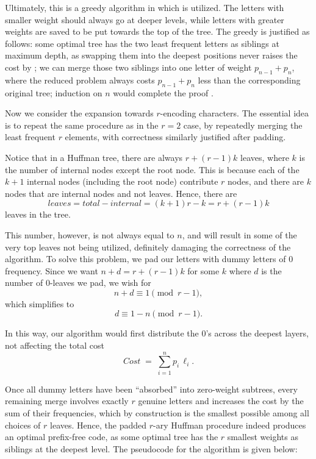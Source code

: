 \documentclass[a4paper,10pt,english]{scrartcl}
\begin{document}
Ultimately, this is a greedy algorithm in which  is utilized. The letters with smaller weight should always go at deeper levels, while letters with greater weights are saved to be put towards the top of the tree. The greedy is justified as follows: some optimal tree has the two least frequent letters as siblings at maximum depth, as swapping them into the deepest positions never raises the cost by ; we can merge those two siblings into one letter of weight $p_{n-1}+p_n$, where the reduced problem always costs $p_{n-1}+p_n$ less than the corresponding original tree; induction on $n$ would complete the proof \cite{Huffman1952}.

Now we consider the expansion towards $r$-encoding characters. The essential idea is to repeat the same procedure as in the $r=2$ case, by repeatedly merging the least frequent $r$ elements, with correctness similarly justified after padding.

Notice that in a Huffman tree, there are always $r + (r-1)k$ leaves, where $k$ is the number of internal nodes except the root node. This is because each of the $k+1$ internal nodes (including the root node) contribute $r$ nodes, and there are $k$ nodes that are internal nodes and not leaves. Hence, there are $$leaves = total - internal = (k+1)r - k = r + (r-1)k$$ leaves in the tree.

This number, however, is not always equal to $n$, and will result in some of the very top leaves not being utilized, definitely damaging the correctness of the algorithm. To solve this problem, we pad our letters with dummy letters of $0$ frequency. Since we want $n+d = r+(r-1)k$ for some $k$ where $d$ is the number of $0$-leaves we pad, we wish for $$n + d \equiv 1 \pmod{r-1},$$ which simplifies to $$d \equiv 1-n \pmod{r-1}.$$

In this way, our algorithm would first distribute the $0$'s across the deepest layers, not affecting the total cost $$Cost \;=\;\sum_{i=1}^n p_i\,\ell_i.$$

Once all dummy letters have been ``absorbed'' into zero-weight subtrees, every remaining merge involves exactly \(r\) genuine letters and increases the cost by the sum of their frequencies, which by construction is the smallest possible among all choices of \(r\) leaves. Hence, the padded \(r\)-ary Huffman procedure indeed produces an optimal prefix-free code, as some optimal tree has the $r$ smallest weights as siblings at the deepest level. The pseudocode for the algorithm is given below:
\end{document}

